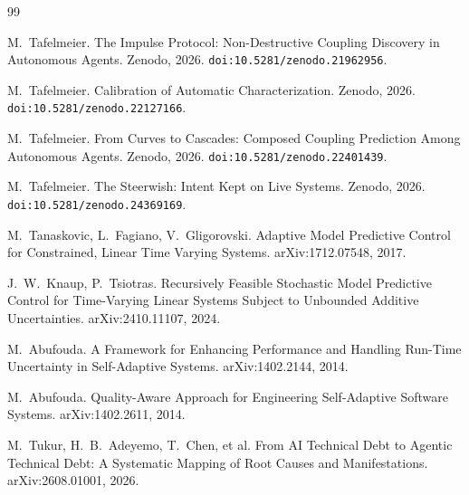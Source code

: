 \documentclass[11pt,a4paper]{article}
\begin{document}
\begin{thebibliography}{99}
\itemsep0pt

 M.~Tafelmeier.
The Impulse Protocol: Non-Destructive Coupling Discovery in
Autonomous Agents. Zenodo, 2026.
\texttt{doi:10.5281/zenodo.21962956}.

 M.~Tafelmeier.
Calibration of Automatic Characterization. Zenodo, 2026.
\texttt{doi:10.5281/zenodo.22127166}.

 M.~Tafelmeier.
From Curves to Cascades: Composed Coupling Prediction Among
Autonomous Agents. Zenodo, 2026.
\texttt{doi:10.5281/zenodo.22401439}.

 M.~Tafelmeier.
The Steerwish: Intent Kept on Live Systems. Zenodo, 2026.
\texttt{doi:10.5281/zenodo.24369169}.

 M.~Tanaskovic, L.~Fagiano,
V.~Gligorovski.
Adaptive Model Predictive Control for Constrained, Linear Time
Varying Systems. arXiv:1712.07548, 2017.

 J.~W.~Knaup, P.~Tsiotras.
Recursively Feasible Stochastic Model Predictive Control for
Time-Varying Linear Systems Subject to Unbounded Additive
Uncertainties. arXiv:2410.11107, 2024.

 M.~Abufouda.
A Framework for Enhancing Performance and Handling Run-Time
Uncertainty in Self-Adaptive Systems. arXiv:1402.2144, 2014.

 M.~Abufouda.
Quality-Aware Approach for Engineering Self-Adaptive Software
Systems. arXiv:1402.2611, 2014.

 M.~Tukur, H.~B.~Adeyemo, T.~Chen, et al.
From AI Technical Debt to Agentic Technical Debt: A Systematic
Mapping of Root Causes and Manifestations. arXiv:2608.01001, 2026.

\end{thebibliography}
\end{document}
